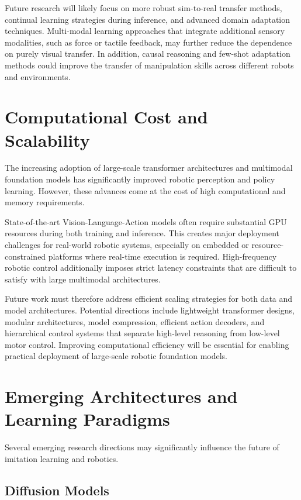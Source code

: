 Future research will likely focus on more robust sim-to-real transfer methods, continual learning strategies during inference, and advanced domain adaptation techniques. Multi-modal learning approaches that integrate additional sensory modalities, such as force or tactile feedback, may further reduce the dependence on purely visual transfer. In addition, causal reasoning and few-shot adaptation methods could improve the transfer of manipulation skills across different robots and environments.

\section{Computational Cost and Scalability}

The increasing adoption of large-scale transformer architectures and multimodal foundation models has significantly improved robotic perception and policy learning. However, these advances come at the cost of high computational and memory requirements.

State-of-the-art Vision-Language-Action models often require substantial GPU resources during both training and inference. This creates major deployment challenges for real-world robotic systems, especially on embedded or resource-constrained platforms where real-time execution is required. High-frequency robotic control additionally imposes strict latency constraints that are difficult to satisfy with large multimodal architectures.

Future work must therefore address efficient scaling strategies for both data and model architectures. Potential directions include lightweight transformer designs, modular architectures, model compression, efficient action decoders, and hierarchical control systems that separate high-level reasoning from low-level motor control. Improving computational efficiency will be essential for enabling practical deployment of large-scale robotic foundation models.

\section{Emerging Architectures and Learning Paradigms}

Several emerging research directions may significantly influence the future of imitation learning and robotics.

\subsection{Diffusion Models}

